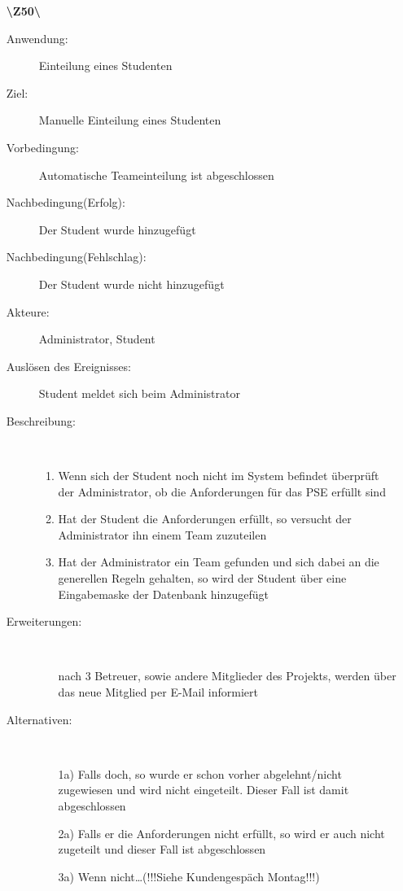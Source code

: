 \documentclass[a4paper]{article}
\begin{document}
\begin{enumerate}
  \item[\textbf{\textbackslash Z50\textbackslash}] \begin{description}
  \item[Anwendung:] Einteilung eines Studenten
  \item[Ziel:] Manuelle Einteilung eines Studenten
  	\item[Vorbedingung:] Automatische Teameinteilung ist abgeschlossen
  	\item[Nachbedingung(Erfolg):] Der Student wurde hinzugefügt
  	\item[Nachbedingung(Fehlschlag):] Der Student wurde nicht hinzugefügt
  	\item[Akteure:] Administrator, Student
  	\item[Auslösen des Ereignisses:] Student meldet sich beim Administrator
  	\item[Beschreibung:]~
  	 \begin{enumerate}[1.]
  	   \item Wenn sich der Student noch nicht im System befindet überprüft der
  	   Administrator, ob die Anforderungen für das PSE erfüllt sind
  	   \item Hat der Student die Anforderungen erfüllt, so versucht der
  	   Administrator ihn einem Team zuzuteilen
  	   \item Hat der Administrator ein Team gefunden und sich dabei an die
  	   generellen Regeln gehalten, so wird der Student über eine Eingabemaske der
  	   Datenbank hinzugefügt
  	 \end{enumerate}
  	\item[Erweiterungen:]~
  	 \begin{enumerate}
  	   \item [nach 3] Betreuer, sowie andere Mitglieder des Projekts, werden
  	   über das neue Mitglied per E-Mail informiert 
  	 \end{enumerate}  
  	\item[Alternativen:] ~
  	 \begin{enumerate}
  	  \item[1a)] Falls doch, so wurde er schon vorher abgelehnt/nicht zugewiesen
  	  und wird nicht eingeteilt. Dieser Fall ist damit abgeschlossen
  	  \item [2a)] Falls er die Anforderungen nicht erfüllt, so wird er auch nicht
  	  zugeteilt und dieser Fall ist abgeschlossen
  	  \item[3a)] Wenn nicht\ldots (!!!Siehe Kundengespäch Montag!!!)
  	 \end{enumerate}  
  \end{description}
\end{enumerate}
\end{document}
